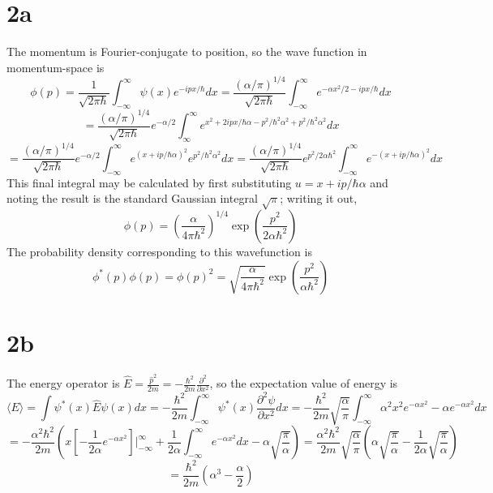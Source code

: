 \documentclass{article}
\begin{document}
\section*{2a}
The momentum is Fourier-conjugate to position, so the wave function in momentum-space is
\[\phi(p)=\frac{1}{\sqrt{2\pi\hbar}}\int_{-\infty}^{\infty}\psi(x)e^{-ipx/\hbar}dx=\frac{(\alpha/\pi)^{1/4}}{\sqrt{2\pi\hbar}}\int_{-\infty}^{\infty}e^{-\alpha x^{2}/2-ipx/\hbar}dx\]
\[=\frac{(\alpha/\pi)^{1/4}}{\sqrt{2\pi\hbar}}e^{-\alpha /2}\int_{\infty}^{\infty}e^{x^{2}+2ipx/\hbar\alpha - p^{2}/\hbar^{2}\alpha^{2}+p^{2}/\hbar^{2}\alpha^{2}}dx\]\[=\frac{(\alpha/\pi)^{1/4}}{\sqrt{2\pi\hbar}}e^{-\alpha/2}\int_{-\infty}^{\infty}e^{(x+ip/\hbar\alpha)^{2}}e^{p^{2}/\hbar^{2}\alpha^{2}}dx=\frac{(\alpha/\pi)^{1/4}}{\sqrt{2\pi\hbar}}e^{p^{2}/2\alpha\hbar^{2}}\int_{-\infty}^{\infty}e^{-(x+ip/\hbar\alpha)^{2}}dx\]
This final integral may be calculated by first substituting $u=x+ip/\hbar\alpha$ and noting the result is the standard Gaussian integral $\sqrt{\pi}$; writing it out,
\[\phi(p)=\left( \frac{\alpha}{4\pi\hbar^{2}} \right)^{1/4}\exp\left( \frac{p^{2}}{2\alpha\hbar^{2}}\right)\]
The probability density corresponding to this wavefunction is
\[\phi^{*}(p)\phi(p)=\phi(p)^{2}=\sqrt{\frac{\alpha}{4\pi\hbar^{2}}}\exp\left( \frac{p^{2}}{\alpha\hbar^{2}} \right)\]

\section*{2b}
The energy operator is $\hat{E}=\frac{\hat{p}^{2}}{2m}=-\frac{\hbar^{2}}{2m}\frac{\partial^{2}}{\partial x^{2}}$, so the expectation value of energy is
\[\langle E \rangle=\int \psi^{*}(x)\hat{E}\psi(x) dx=-\frac{\hbar^{2}}{2m}\int_{-\infty}^{\infty}\psi^{*}(x)\frac{\partial^{2}\psi}{\partial x^{2}}dx=-\frac{\hbar^{2}}{2m}\sqrt{\frac{\alpha}{\pi}}\int_{-\infty}^{\infty}\alpha^{2}x^{2}e^{-\alpha x^{2}}-\alpha e^{-\alpha x^{2}}dx\]
\[=-\frac{\alpha^{2}\hbar^{2}}{2m}\left( x\left[ -\frac{1}{2\alpha}e^{-\alpha x^{2}} \right]\bigg|_{-\infty}^{\infty}+\frac{1}{2\alpha}\int_{-\infty}^{\infty} e^{-\alpha x^{2}}dx-\alpha\sqrt{\frac{\pi}{\alpha}}\right)=\frac{\alpha^{2}\hbar^{2}}{2m}\sqrt{\frac{\alpha}{\pi}}\left( \alpha\sqrt{\frac{\pi}{\alpha}} -\frac{1}{2\alpha}\sqrt{\frac{\pi}{\alpha}}\right)\]
\[=\frac{\hbar^{2}}{2m}\left( \alpha^{3}-\frac{\alpha}{2} \right)\]
\end{document}
